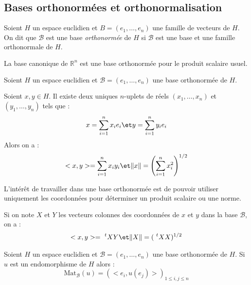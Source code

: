 \documentclass[a4paper,10pt]{report}
\begin{document}
\subsection{Bases orthonormées et orthonormalisation}
\begin{defin} Soient $H$ un espace euclidien et $B= (e_1, \ldots, e_n)$ une famille de vecteurs de $H$. On dit que $\mathcal{B}$ est une base \textit{orthonormée} de $H$ si $\mathcal{B}$ est une base et une famille orthonormale de $H$.
\end{defin}

\begin{ex} La base canonique de $\mathbb{R}^n$ est une base orthonormée pour le produit scalaire usuel.
\end{ex}

\begin{prop}
Soient $H$ un espace euclidien et $\mathcal{B}=(e_1, \ldots, e_n)$ une base orthonormée de $H$.

\noindent Soient $x,y \in H$. Il existe deux uniques $n$-uplets de réels $(x_1, \ldots, x_n)$ et $(y_1, \ldots, y_n)$ tels que :
$$ x = \sum_{i=1}^n x_i e_i \et y = \sum_{i=1}^n y_i e_i $$
Alors on a :
$$ <x,y> = \sum_{i=1}^n x_i y_i \et  \Vert x \Vert = \left( \sum_{i=1}^n x_i^2 \right)^{1/2} $$
\end{prop}

\begin{preuve}
\vspace{4cm}
\end{preuve}

\begin{rems} 
\item L'intérêt de travailler dans une base orthonormée est de pouvoir utiliser uniquement les coordonnées pour déterminer un produit scalaire ou une norme.
\item Si on note $X$ et $Y$ les vecteurs colonnes des coordonnées de $x$ et $y$ dans la base $\mathcal{B}$, on a :
$$ <x,y> = ~^tXY \et \Vert X \Vert = (~^tXX)^{1/2}$$
\end{rems}

\begin{prop}
Soient $H$ un espace euclidien et $\mathcal{B}=(e_1, \ldots, e_n)$ une base orthonormée de $H$. Si $u$ est un endomorphisme de $H$ alors :
$$ \textrm{Mat}_{\mathcal{B}}(u) = (<e_i, u(e_j)>)_{1 \leq i,j \leq n}$$
\end{prop}

\begin{preuve}
\vspace{6cm}
\end{preuve}
\end{document}
